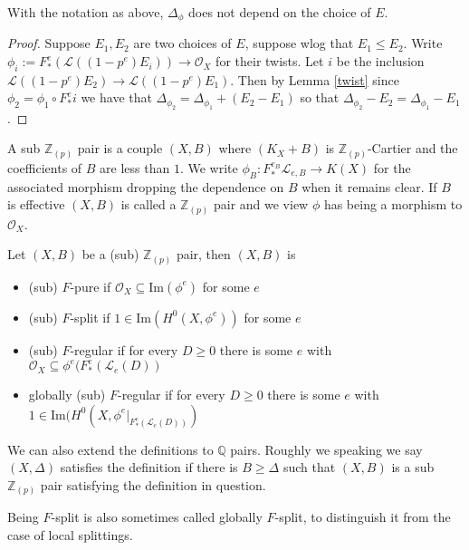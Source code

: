 \documentclass[a4paper,12pt]{book}
\newcommand{\Fe}{F^{e}_{*}}
\newcommand{\ox}{\mathcal{O}_{X}}
\newcommand{\zp}{\mathbb{Z}_{(p)}}
\begin{document}
\begin{lemma}
	With the notation as above, $\Delta_{\phi}$ does not depend on the choice of $E$.
\end{lemma}
\begin{proof}
	Suppose $E_{1},E_{2}$ are two choices of $E$, suppose wlog that $E_{1} \leq E_{2}$. Write $\phi_{i}:=\Fe(\mathcal{L}((1-p^{e})E_{i})) \to \ox$ for their twists. Let $i$ be the inclusion $\mathcal{L}((1-p^{e})E_{2}) \to\mathcal{L}((1-p^{e})E_{1})$. Then by Lemma \ref{twist} since $\phi_{2}=\phi_{1}\circ F_{*}^{e}i$ we have that $\Delta_{\phi_{2}}=\Delta_{\phi_{1}}+(E_{2}-E_{1})$ so that $\Delta_{\phi_{2}}-E_{2}=\Delta_{\phi_{1}}-E_{1}$.
\end{proof}


\begin{definition}
	A sub $\zp$ pair is a couple $(X,B)$ where $(K_{X}+B)$ is $\zp$-Cartier and the coefficients of $B$ are less than $1$. We write $\phi_{B}: F_{*}^{e_{B}}\mathcal{L}_{e,B} \to K(X)$ for the associated morphism dropping the dependence on $B$ when it remains clear. If $B$ is effective $(X,B)$ is called a $\zp$ pair and we view $\phi$ has being a morphism to $\ox$.
	
	Let $(X,B)$ be a (sub) $\zp$ pair, then $(X,B)$ is
	\begin{itemize}
		\item (sub) $F$-pure if $\ox \subseteq \text{Im}(\phi^{e})$ for some $e$
		\item (sub) $F$-split if $1\in\text{Im}(H^{0}(X,\phi^{e}))$ for some $e$
		\item (sub) $F$-regular if for every $D \geq 0$ there is some $e$ with $\ox \subseteq \phi^{e}(\Fe(\mathcal{L}_{e}(D))$ 
		\item globally (sub) $F$-regular if for every $D \geq 0$ there is some $e$ with $1\in\text{Im}(H^{0}(X,\phi^{e}|_{\Fe(\mathcal{L}_{e}(D))})$ 
	\end{itemize}
\end{definition}

\begin{remark}
	
	We can also extend the definitions to $\mathbb{Q}$ pairs. Roughly we speaking we say $(X,\Delta)$ satisfies the definition if there is $B \geq \Delta$ such that $(X,B)$ is a sub $\zp$ pair satisfying the definition in question. 	
	\end{remark}

Being $F$-split is also sometimes called globally $F$-split, to distinguish it from the case of local splittings.
\end{document}
